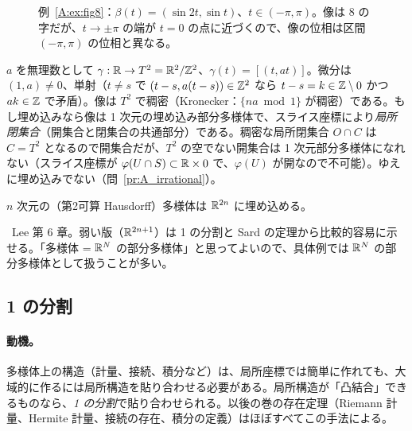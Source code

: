 \begin{figure}[htbp]
\centering
{}
\caption{例~\ref{A:ex:fig8}：$\beta(t)=(\sin2t,\sin t)$、$t\in(-\pi,\pi)$。像は 8 の字だが、$t\to\pm\pi$ の端が $t=0$ の点に近づくので、像の位相は区間 $(-\pi,\pi)$ の位相と異なる。}\label{A:fig:fig8}
\end{figure}

\begin{ex}[トーラス上の無理数傾きの直線]\label{A:ex:irr}
$a$ を無理数として $\gamma:\mathbb R\to T^2=\mathbb R^2/\mathbb Z^2$、$\gamma(t)=[(t,at)]$。微分は $(1,a)\ne0$、単射（$t\ne s$ で $(t-s,a(t-s))\in\mathbb Z^2$ なら $t-s=k\in\mathbb Z\setminus0$ かつ $ak\in\mathbb Z$ で矛盾）。像は $T^2$ で稠密（Kronecker：$\{na\bmod1\}$ が稠密）である。もし埋め込みなら像は 1 次元の埋め込み部分多様体で、スライス座標により\emph{局所閉集合}（開集合と閉集合の共通部分）である。稠密な局所閉集合 $O\cap C$ は $C=T^2$ となるので開集合だが、$T^2$ の空でない開集合は 1 次元部分多様体になれない（スライス座標が $\varphi(U\cap S)\subset\mathbb R\times0$ で、$\varphi(U)$ が開なので不可能）。ゆえに埋め込みでない（問~\ref{pr:A_irrational}）。
\end{ex}

\begin{thm}
$n$ 次元の（第2可算 Hausdorff）多様体は $\mathbb R^{2n}$ に埋め込める。
\end{thm}
\tC\ Lee 第 6 章。弱い版（$\mathbb R^{2n+1}$）は 1 の分割と Sard の定理から比較的容易に示せる。「多様体 = $\mathbb R^N$ の部分多様体」と思ってよいので、具体例では $\mathbb R^N$ の部分多様体として扱うことが多い。

\subsection{1 の分割}
\paragraph{動機。}多様体上の構造（計量、接続、積分など）は、局所座標では簡単に作れても、大域的に作るには局所構造を貼り合わせる必要がある。局所構造が「凸結合」できるものなら、\emph{1 の分割}で貼り合わせられる。以後の巻の存在定理（Riemann 計量、Hermite 計量、接続の存在、積分の定義）はほぼすべてこの手法による。

